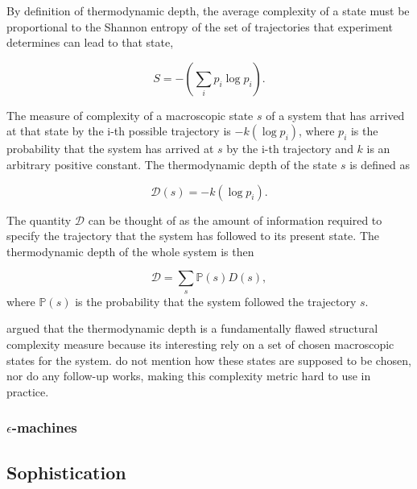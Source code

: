 By definition of thermodynamic depth, the average complexity of a state must be
proportional to the Shannon entropy
\parencite{shannonMathematicalTheoryCommunication1975} of the set of
trajectories that experiment determines can lead to that state,

\begin{equation}
  \label{eq:3}
  S = -\left(\sum_{i} p_{i} \log p_{i}\right).
\end{equation}

The measure of complexity of a macroscopic state $s$ of a system that has
arrived at that state by the i-th possible trajectory is $-k(\log p_{i})$, where
$p_{i}$ is the probability that the system has arrived at $s$ by the i-th
trajectory and $k$ is an arbitrary positive constant. The thermodynamic depth of
the state $s$ is defined as

\begin{equation}
  \label{eq:4}
  \mathcal{D}(s) = -k(\log p_{i}).
\end{equation}

The quantity $\mathcal{D}$ can be thought of as the amount of information
required to specify the trajectory that the system has followed to its present
state. The thermodynamic depth of the whole system is then

\begin{equation}
  \label{eq:5}
  \mathcal{D} = \sum_{s}\mathbb{P}(s)D(s),
\end{equation}
where $\mathbb{P}(s)$ is the probability that the system followed the
trajectory $s$.

\textcite{crutchfieldThermodynamicDepthCausal1999} argued that the thermodynamic
depth is a fundamentally flawed structural complexity measure because its
interesting rely on a set of chosen macroscopic states for the system.
\textcite{lloydComplexityThermodynamicDepth1988} do not mention how these states
are supposed to be chosen, nor do any follow-up works, making this complexity
metric hard to use in practice.

\subsubsection{$\epsilon$-machines}

\parencite{crutchfieldInferringStatisticalComplexity1989,
  crutchfieldCalculiEmergenceComputation1994,
  feldmanMeasuresStatisticalComplexity1998}

\subsection{Sophistication}

